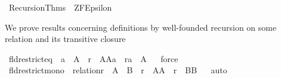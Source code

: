 %
\begin{isabellebody}%
%
%
\isadelimdocument
%
\endisadelimdocument
%
\isatagdocument
%
\isamarkuptrue%
%
\endisatagdocument
{\isafolddocument}%
%
\isadelimdocument
%
\endisadelimdocument
%
\isadelimtheory
%
\endisadelimtheory
%
\isatagtheory
{}\isamarkupfalse%
\ Recursion{\isacharunderscore}{\kern0pt}Thms\ \ ZF{\isachardot}{\kern0pt}Epsilon\ %
\endisatagtheory
{\isafoldtheory}%
%
\isadelimtheory
%
\endisadelimtheory
%
\begin{isamarkuptext}%
We prove results concerning definitions by well-founded
recursion on some relation  and its transitive closure
%
\end{isamarkuptext}\isamarkuptrue%
\isamarkupfalse%
\ fld{\isacharunderscore}{\kern0pt}restrict{\isacharunderscore}{\kern0pt}eq\ {\isacharcolon}{\kern0pt}\ {\isachardoublequoteopen}a\ {\isasymin}\ A\ {\isasymLongrightarrow}\ {\isacharparenleft}{\kern0pt}r\ {\isasyminter}\ A{\isasymtimes}A{\isacharparenright}{\kern0pt}{\isacharminus}{\kern0pt}{\isacharbackquote}{\kern0pt}{\isacharbackquote}{\kern0pt}{\isacharbraceleft}{\kern0pt}a{\isacharbraceright}{\kern0pt}\ {\isacharequal}{\kern0pt}\ {\isacharparenleft}{\kern0pt}r{\isacharminus}{\kern0pt}{\isacharbackquote}{\kern0pt}{\isacharbackquote}{\kern0pt}{\isacharbraceleft}{\kern0pt}a{\isacharbraceright}{\kern0pt}\ {\isasyminter}\ A{\isacharparenright}{\kern0pt}{\isachardoublequoteclose}\isanewline
%
\isadelimproof
\ \ %
\endisadelimproof
%
\isatagproof
{}\isamarkupfalse%
{\isacharparenleft}{\kern0pt}force{\isacharparenright}{\kern0pt}%
\endisatagproof
{\isafoldproof}%
%
\isadelimproof
\isanewline
%
\endisadelimproof
\isanewline
{}\isamarkupfalse%
\ fld{\isacharunderscore}{\kern0pt}restrict{\isacharunderscore}{\kern0pt}mono\ {\isacharcolon}{\kern0pt}\ {\isachardoublequoteopen}relation{\isacharparenleft}{\kern0pt}r{\isacharparenright}{\kern0pt}\ {\isasymLongrightarrow}\ A\ {\isasymsubseteq}\ B\ {\isasymLongrightarrow}\ r\ {\isasyminter}\ A{\isasymtimes}A\ {\isasymsubseteq}\ r\ {\isasyminter}\ B{\isasymtimes}B{\isachardoublequoteclose}\isanewline
%
\isadelimproof
\ \ %
\endisadelimproof
%
\isatagproof
{}\isamarkupfalse%
{\isacharparenleft}{\kern0pt}auto{\isacharparenright}{\kern0pt}%
\endisatagproof
{\isafoldproof}%
%
\isadelimproof
\isanewline
%
\endisadelimproof

\end{isabellebody}

